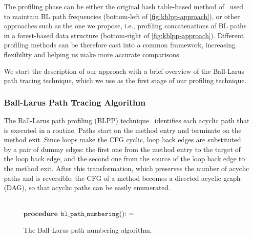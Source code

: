 The profiling phase can be either the original hash table-based method of~\cite{Ball96} used to maintain BL path frequencies
(bottom-left of \myfigure\ref{fig:kblpp-approach}), or other approaches such as the one we propose, i.e., profiling concatenations of BL paths in a forest-based data structure (bottom-right of \myfigure\ref{fig:kblpp-approach}). Different profiling methods can be therefore cast into a common framework, increasing flexibility and helping us make more accurate comparisons.

We start the description of our approach with a brief overview of the Ball-Larus path tracing technique, which we use as the first stage of our profiling technique.

\subsubsection*{Ball-Larus Path Tracing Algorithm}

The Ball-Larus path profiling (BLPP) technique~\cite{Ball96} identifies each acyclic path that is executed in a routine. Paths start on the method entry and terminate on the method exit. Since loops make the CFG cyclic, loop back edges are substituted by a pair of dummy edges: the first one from the method entry to the target of the loop back edge, and the second one from the source of the loop back edge to the method exit. After this transformation, which preserves the number of acyclic paths and is reversible, the CFG of a method becomes a directed acyclic graph (DAG), so that acyclic paths can be easily enumerated.

\ifdefined\noauthorea
\begin{figure}[h!]
\IncMargin{2em}
\begin{algorithm}[H]
\DontPrintSemicolon
\LinesNumbered
\SetAlgoNoLine
\SetNlSkip{1em} 
\Indm\Indmm
\hrulefill\\
$\mathbf{procedure} \> \> \texttt{bl\_path\_numbering}$():\;
\vspace{1mm}
\everypar={\nl}
\Indp\Indpp
{}
\vspace{-2mm}
\Indm\Indmm
\nonl\hrulefill\vspace{1mm}\\
\DecMargin{5em}
\caption{\label{alg:kblpp-bl-numbering} The Ball-Larus path numbering algorithm.}
\IncMargin{3em}
\end{algorithm}
\end{figure}

